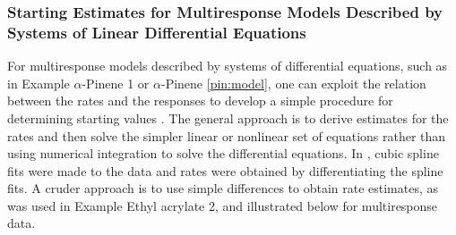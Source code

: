 \subsubsection{Starting Estimates for Multiresponse Models Described by
Systems of Linear Differential Equations}

For multiresponse models described by systems of differential
equations, such as in Example $\alpha$-Pinene 1 or
$\alpha$-Pinene \ref{pin:model}, one can exploit the relation
between the rates and the responses to develop a simple procedure
for determining starting values
\cite{bate:watt:1985,vara:1982}.
The general approach is to derive estimates for the rates and
then solve the simpler linear or nonlinear set of equations
rather than using numerical integration to solve the differential
equations.
In , cubic spline fits were made to the data and
rates were obtained by differentiating the spline fits.
A cruder approach is to use simple differences to obtain
rate estimates, as was used in Example Ethyl acrylate 2, and
illustrated below for multiresponse data.
\label{pin:2}

